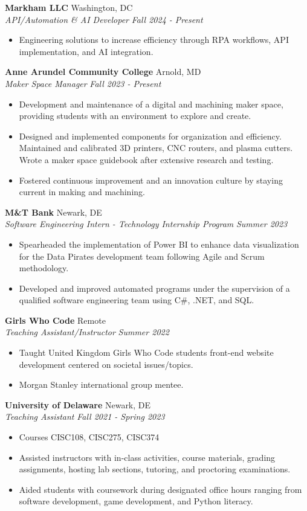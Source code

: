 \documentclass[letterpaper,10pt]{article}
\newcommand{\entry}[4]{%
  \vspace{2pt}
  \noindent\textbf{#1} \hfill #2 \\
  \noindent\textit{#3} \hfill \textit{#4}\par
  \vspace{-2pt}
}
\begin{document}
\entry{Markham LLC}{Washington, DC}
      {API/Automation \& AI Developer}{Fall 2024 - Present}
      \begin{itemize}
        \item Engineering solutions to increase efficiency through RPA workflows, API implementation, and AI integration.
      \end{itemize}
\entry{Anne Arundel Community College}{Arnold, MD}
      {Maker Space Manager}{Fall 2023 - Present}
      \begin{itemize}
        \item Development and maintenance of a digital and machining maker space, providing students with an environment to explore and create. 
        \item Designed and implemented components for organization and efficiency. Maintained and calibrated 3D printers, CNC routers, and plasma cutters. Wrote a maker space guidebook after extensive research and testing. 
        \item Fostered continuous improvement and an innovation culture by staying current in making and machining.
      \end{itemize}
\entry{M\&T Bank}{Newark, DE}
      {Software Engineering Intern - Technology Internship Program}{Summer 2023}
      \begin{itemize}
        \item Spearheaded the implementation of Power BI to enhance data visualization for the Data Pirates development team following Agile and Scrum methodology. 
        \item Developed and improved automated programs under the supervision of a qualified software engineering team using C\#, .NET, and SQL.
      \end{itemize}
\entry{Girls Who Code}{Remote}
      {Teaching Assistant/Instructor}{Summer 2022}
      \begin{itemize}
        \item Taught United Kingdom Girls Who Code students front-end website development centered on societal issues/topics.
        \item Morgan Stanley international group mentee.
      \end{itemize}
\entry{University of Delaware}{Newark, DE}
      {Teaching Assistant}{Fall 2021 - Spring 2023}
      \begin{itemize}
        \item Courses CISC108, CISC275, CISC374
        \item Assisted instructors with in-class activities, course materials, grading assignments, hosting lab sections, tutoring, and proctoring examinations. 
        \item Aided students with coursework during designated office hours ranging from software development, game development, and Python literacy.
      \end{itemize}
\end{document}

